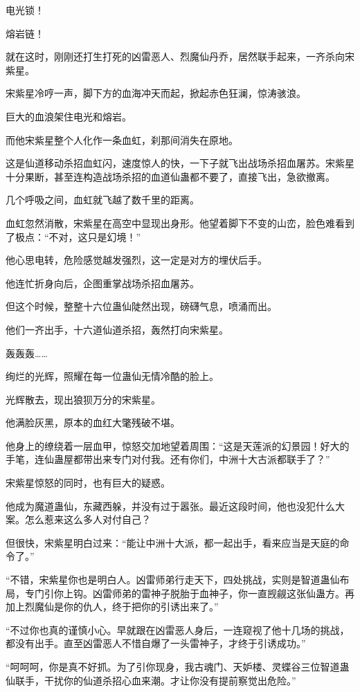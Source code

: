 \begin{this_body}
电光锁！

熔岩链！

就在这时，刚刚还打生打死的凶雷恶人、烈魔仙丹乔，居然联手起来，一齐杀向宋紫星。

宋紫星冷哼一声，脚下方的血海冲天而起，掀起赤色狂澜，惊涛骇浪。

巨大的血浪架住电光和熔岩。

而他宋紫星整个人化作一条血虹，刹那间消失在原地。

这是仙道移动杀招血虹闪，速度惊人的快，一下子就飞出战场杀招血屠苏。宋紫星十分果断，甚至连构造战场杀招的血道仙蛊都不要了，直接飞出，急欲撤离。

几个呼吸之间，血虹就飞越了数千里的距离。

血虹忽然消散，宋紫星在高空中显现出身形。他望着脚下不变的山峦，脸色难看到了极点：“不对，这只是幻境！”

他心思电转，危险感觉越发强烈，这一定是对方的埋伏后手。

他连忙折身向后，企图重掌战场杀招血屠苏。

但这个时候，整整十六位蛊仙陡然出现，磅礴气息，喷涌而出。

他们一齐出手，十六道仙道杀招，轰然打向宋紫星。

轰轰轰……

绚烂的光辉，照耀在每一位蛊仙无情冷酷的脸上。

光辉散去，现出狼狈万分的宋紫星。

他满脸灰黑，原本的血红大氅残破不堪。

他身上的缭绕着一层血甲，惊怒交加地望着周围：“这是天莲派的幻景园！好大的手笔，连仙蛊屋都带出来专门对付我。还有你们，中洲十大古派都联手了？”

宋紫星惊怒的同时，也有巨大的疑惑。

他成为魔道蛊仙，东藏西躲，并没有过于嚣张。最近这段时间，他也没犯什么大案。怎么惹来这么多人对付自己？

但很快，宋紫星明白过来：“能让中洲十大派，都一起出手，看来应当是天庭的命令了。”

“不错，宋紫星你也是明白人。凶雷师弟行走天下，四处挑战，实则是智道蛊仙布局，专门引你上钩。凶雷师弟的雷神子脱胎于血神子，你一直觊觎这张仙蛊方。再加上烈魔仙是你的仇人，终于把你的引诱出来了。”

“不过你也真的谨慎小心。早就跟在凶雷恶人身后，一连窥视了他十几场的挑战，都没有出手。直至凶雷恶人不惜自爆了一头雷神子，才终于引诱成功。”

“呵呵呵，你是真不好抓。为了引你现身，我古魂门、天妒楼、灵蝶谷三位智道蛊仙联手，干扰你的仙道杀招心血来潮。才让你没有提前察觉出危险。”


\end{this_body}
